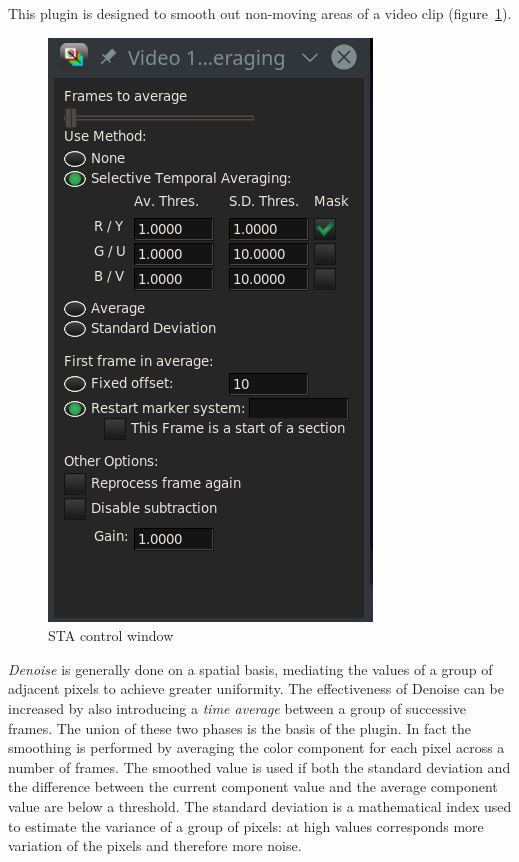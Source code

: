 This plugin is designed to smooth out non-moving areas of a video clip (figure~\ref{fig:staveraging}).
\vspace{2ex}
\begin{figure} 
    \vspace{-4ex}
    \includegraphics[width=0.9\linewidth]{images/staveraging.png}
    \caption{STA control window}
    \label{fig:staveraging}
\end{figure}

\textit{Denoise} is generally done on a spatial basis, mediating the values of a group of adjacent pixels to achieve greater uniformity. The effectiveness of Denoise can be increased by also introducing a \textit{time average} between a group of successive frames. The union of these two phases is the basis of the plugin. In fact the smoothing is performed by averaging the color component for each pixel across a number of frames. The smoothed value is used if both the standard deviation and the difference between the current component value and the average component value are below a threshold. The standard deviation is a mathematical index used to estimate the variance of a group of pixels: at high values corresponds more variation of the pixels and therefore more noise.

